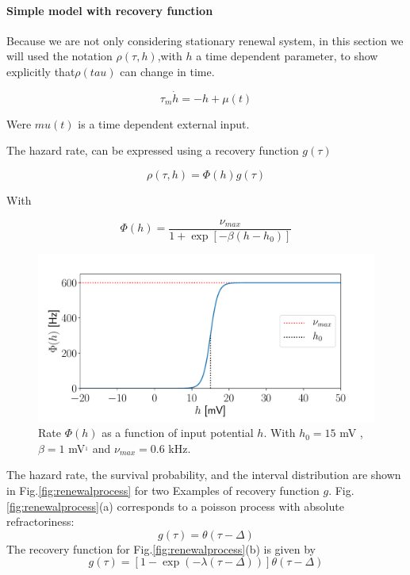 \documentclass[12pt,twoside]{report}
\begin{document}
\paragraph{Simple model with recovery function}


Because we are not only considering stationary renewal system, in this section we will used the notation $\rho(\tau,h)$,with $h$ a time dependent parameter, to show explicitly that$\rho(tau)$ can change in time.


\begin{equation}
\label{eq:hi}
\tau_m\dot h=-h+\mu(t)
\end{equation}


Were $mu(t)$ is a time dependent external input.

The hazard rate, can be expressed using a recovery function $g(\tau)$

\begin{equation}
\label{eq:rho}
\rho(\tau,h)=\Phi(h)g(\tau)
\end{equation}

With 

\begin{equation}
\label{eq:phi}
\Phi(h)=\frac{\nu_{max}}{1+\exp[-\beta(h-h_0)]}
\end{equation}

\begin{figure}[h!]
	\centering
	\includegraphics[width=0.8\linewidth]{phi_h.pdf}
	\caption{ Rate $\Phi(h)$ as a function of input potential $h$. With $h_0=15$ mV , $\beta=1$ mV$^{_1}$ and $\nu_{max}=0.6$ kHz.}
	\label{fig:phi_h}
\end{figure}

The hazard rate, the survival probability, and the interval distribution are shown in Fig.\ref{fig:renewalprocess} for two Examples of recovery function $g$. Fig.\ref{fig:renewalprocess}(a) corresponds to a poisson process with absolute refractoriness: 
\begin{equation}
\label{eq:poissonabs}
g(\tau)=\theta(\tau-\Delta)
\end{equation}
The recovery function for Fig.\ref{fig:renewalprocess}(b) is given by
\begin{equation}
\label{eq:expabs}
g(\tau)=\left[1-\exp(-\lambda(\tau-\Delta))\right]\theta(\tau-\Delta)
\end{equation}
\end{document}
